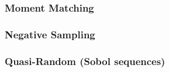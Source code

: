\subsubsection{Moment Matching}
    \todo
\subsubsection{Negative Sampling}
    \todo
\subsubsection{Quasi-Random (Sobol sequences)}
    \todo
